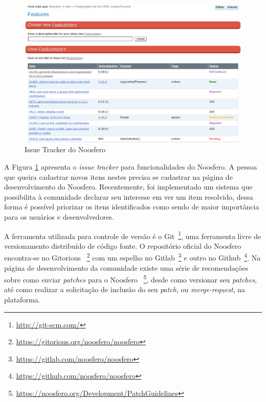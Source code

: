 \begin{figure}[h]
    \centering
    \includegraphics[keepaspectratio=true,scale=0.4]
      {figuras/issue-tracker.eps}
    \caption{Issue Tracker do Noosfero}
    \label{issue-tracker}
\end{figure}

A Figura \ref{issue-tracker} apresenta o \textit{issue tracker} para
funcionalidades do Noosfero.
%
A pessoa que queira cadastrar novos itens nestes precisa se cadastrar
na página de desenvolvimento do Noosfero.
%
Recentemente, foi implementado um sistema que possibilita à comunidade declarar
seu interesse em ver um item resolvido, dessa forma é possível priorizar os
itens identificados como sendo de maior importância para os usuários e
desenvolvedores.

A ferramenta utilizada para controle de versão é o Git~\footnote{
\url{http://git-scm.com/}}, uma ferramenta livre de versionamento distribuído
de código fonte. O repositório oficial do Noosfero encontra-se no Gitorious
~\footnote{\url{https://gitorious.org/noosfero/noosfero}} com um espelho no
Gitlab~\footnote{\url{https://gitlab.com/noosfero/noosfero}} e outro no
Github~\footnote{\url{https://github.com/noosfero/noosfero}}.
%
Na página de desenvolvimento da comunidade existe uma série de recomendações
sobre como enviar \textit{patches} para o Noosfero%
~\footnote{\url{https://noosfero.org/Development/PatchGuidelines}},
desde como versionar seu \textit{patches}, até como realizar a solicitação de
inclusão do seu \textit{patch}, ou \textit{merge-request}, na plataforma.

